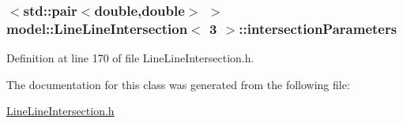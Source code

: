 \subsubsection[{intersection\+Parameters}]{$<$std\+::pair$<$double,double$>$ $>$ {\bf model\+::\+Line\+Line\+Intersection}$<$ 3 $>$\+::intersection\+Parameters}\label{classmodel_1_1_line_line_intersection_3_013_01_4_a0e74f0fbbd81ec67488d8f67723d1c0f}


Definition at line 170 of file Line\+Line\+Intersection.\+h.



The documentation for this class was generated from the following file\+:\begin{DoxyCompactItemize}
\item 
\hyperlink{_line_line_intersection_8h}{Line\+Line\+Intersection.\+h}\end{DoxyCompactItemize}
